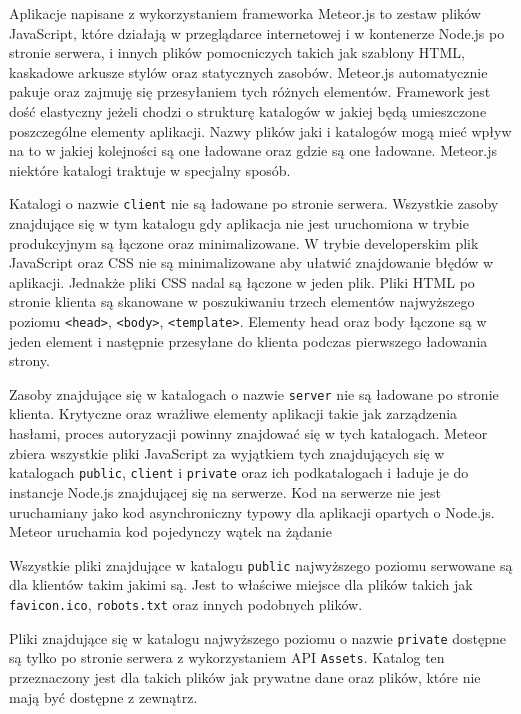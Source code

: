 Aplikacje napisane z wykorzystaniem frameworka Meteor.js to zestaw plików JavaScript, które działają w przeglądarce internetowej i w kontenerze Node.js po stronie serwera, i innych plików pomocniczych takich jak szablony HTML, kaskadowe arkusze stylów oraz statycznych zasobów. Meteor.js automatycznie pakuje oraz zajmuję się przesyłaniem tych różnych elementów. Framework jest dość elastyczny jeżeli chodzi o strukturę katalogów w jakiej będą umieszczone poszczególne elementy aplikacji. Nazwy plików jaki i katalogów mogą mieć wpływ na to w jakiej kolejności są one ładowane oraz gdzie są one ładowane. Meteor.js niektóre katalogi traktuje w specjalny sposób.

Katalogi o nazwie \verb|client| nie są ładowane po stronie serwera. Wszystkie zasoby znajdujące się w tym katalogu gdy aplikacja nie jest uruchomiona w trybie produkcyjnym są łączone oraz minimalizowane. W trybie developerskim plik JavaScript oraz CSS nie są minimalizowane aby ułatwić znajdowanie błędów w aplikacji. Jednakże pliki CSS nadal są łączone w jeden plik. Pliki HTML po stronie klienta są skanowane w poszukiwaniu trzech elementów najwyższego poziomu \verb|<head>|, \verb|<body>|, \verb|<template>|. Elementy head oraz body łączone są w jeden element i następnie przesyłane do klienta podczas pierwszego ładowania strony.

Zasoby znajdujące się w katalogach o nazwie \verb|server| nie są ładowane po stronie klienta. Krytyczne oraz wrażliwe elementy aplikacji takie jak zarządzenia hasłami, proces autoryzacji powinny znajdować się w tych katalogach. Meteor zbiera wszystkie pliki JavaScript za wyjątkiem tych znajdujących się w katalogach \verb|public|, \verb|client| i \verb|private| oraz ich podkatalogach i ładuje je do instancje Node.js znajdującej się na serwerze. Kod na serwerze nie jest uruchamiany jako kod asynchroniczny typowy dla aplikacji opartych o Node.js. Meteor uruchamia kod pojedynczy wątek na żądanie

Wszystkie pliki znajdujące w katalogu \verb|public| najwyższego poziomu serwowane są dla klientów takim jakimi są. Jest to właściwe miejsce dla plików takich jak \verb|favicon.ico|, \verb|robots.txt| oraz innych podobnych plików.

Pliki znajdujące się w katalogu najwyższego poziomu o nazwie \verb|private| dostępne są tylko po stronie serwera z wykorzystaniem API \verb|Assets|. Katalog ten przeznaczony jest dla takich plików jak prywatne dane oraz plików, które nie mają być dostępne z zewnątrz.

